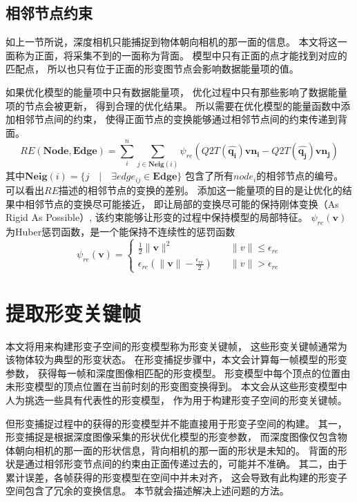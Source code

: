 \subsection{相邻节点约束}
如上一节所说，深度相机只能捕捉到物体朝向相机的那一面的信息。
本文将这一面称为正面，将采集不到的一面称为背面。
模型中只有正面的点才能找到对应的匹配点，
所以也只有位于正面的形变图节点会影响数据能量项的值。

如果优化模型的能量项中只有数据能量项，
优化过程中只有那些影响了数据能量项的节点会被更新，
得到合理的优化结果。
所以需要在优化模型的能量函数中添加相邻节点间的约束，
使得正面节点的变换能够通过相邻节点间的约束传递到背面。
\begin{equation}
    RE(\bm{Node},\bm{Edge})=
    \sum_{i}^{n}
    \sum_{j \in \bm{Neig}(i)}
    \psi_{re}(
            Q2T(
                \hat{\bm{q_i}}
            )
            \bm{vn_i}
            -
            Q2T(
                \hat{\bm{q_j}}
            )
            \bm{vn_j}
        )
\end{equation}
其中$\bm{Neig}(i)=\{j \quad | \quad \exists edge_{ij} \in \bm{Edge}\}$
包含了所有$node_i$的相邻节点的编号。
可以看出$RE$描述的相邻节点的变换的差别。
添加这一能量项的目的是让优化的结果中相邻节点的变换尽可能接近，
即让局部的变换尽可能的保持刚体变换（As Rigid As Possible）,
该约束能够让形变的过程中保持模型的局部特征。
$\psi_{re}(\bm{v})$为Huber惩罚函数，是一个能保持不连续性的惩罚函数
\begin{equation}
    \psi_{re}(\bm{v}) = 
    \begin{cases}
        \frac{1}{2}\|\bm{v}\|^2
        &\quad \|v\| \leq \epsilon_{re}\\
        \epsilon_{re}(\|\bm{v}\|-\frac{\epsilon_{re}}{2})
        &\quad \|v\| > \epsilon_{re}
    \end{cases}
\end{equation}
\section{提取形变关键帧}
本文将用来构建形变子空间的形变模型称为形变关键帧，
这些形变关键帧通常为该物体较为典型的形变状态。
在形变捕捉步骤中，本文会计算每一帧模型的形变参数，
获得每一帧和深度图像相匹配的形变模型。
形变模型中每个顶点的位置由未形变模型的顶点位置在当前时刻的形变图变换得到。
本文会从这些形变模型中人为挑选一些具有代表性的形变模型，
作为用于构建形变子空间的形变关键帧。

但形变捕捉过程中的获得的形变模型并不能直接用于形变子空间的构建。
其一，形变捕捉是根据深度图像采集的形状优化模型的形变参数，
而深度图像仅包含物体朝向相机的那一面的形状信息，背向相机的那一面的形状是未知的。
背面的形状是通过相邻形变节点间的约束由正面传递过去的，可能并不准确。
其二，由于累计误差，各帧获得的形变模型在空间中并未对齐，
这会导致有此构建的形变子空间包含了冗余的变换信息。
本节就会描述解决上述问题的方法。
